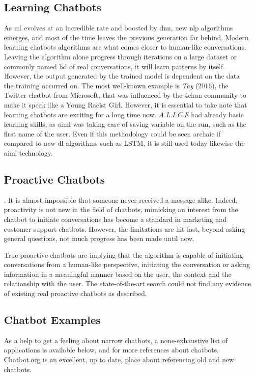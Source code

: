 \subsection{Learning Chatbots} 
As \gls{ml} evolves at an incredible rate and boosted by \gls{dnn}, new \gls{nlp} algorithms emerges, and most of the time leaves the previous generation far behind. Modern learning chatbots algorithms are what comes closer to human-like conversations. Leaving the algorithm alone progress through iterations on a large dataset or commonly named \gls{bd} of real conversations, it will learn patterns by itself. However, the output generated by the trained model is dependent on the data the training occurred on. The most well-known example is \textit{Tay}\cite{chatbot:tay} (2016), the Twitter chatbot from Microsoft, that was influenced by the 4chan community to make it speak like a Young Racist Girl.
However, it is essential to take note that learning chatbots are exciting for a long time now. \textit{A.L.I.C.E}\cite{chatbot:alice} had already basic learning skills, as \gls{aiml} was taking care of saving variable on the run, such as the first name of the user. Even if this methodology could be seen archaic if compared to new \gls{dl} algorithms such as LSTM, it is still used today likewise the \gls{aiml} technology.


\subsection{Proactive Chatbots}
. It is almost impossible that someone never received a message alike. Indeed, proactivity is not new in the field of chatbots, mimicking an interest from the chatbot to initiate conversations has become a standard in marketing and customer support chatbots. However, the limitations are hit fast, beyond asking general questions, not much progress has been made until now.

True proactive chatbots are implying that the algorithm is capable of initiating conversations from a human-like perspective, initiating the conversation or asking information in a meaningful manner based on the user, the context and the relationship with the user. The state-of-the-art search could not find any evidence of existing real proactive chatbots as described.


\subsection{Chatbot Examples}
As a help to get a feeling about narrow chatbots, a none-exhaustive list of applications is available below, and for more references about chatbots, Chatbot.org\cite{chatbot:chatbots-org} is an excellent, up to date, place about referencing old and new chatbots.

